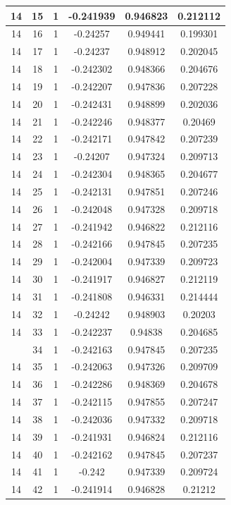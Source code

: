 \documentclass[12pt,a4paper]{article}
\numberwithin{equation}{section}
\numberwithin{figure}{section}
\numberwithin{table}{section}
\begin{document}
\begin{longtable}{|c|c|c|c|c|c|}
14 & 15 & 1 & -0.241939 & 0.946823 & 0.212112 \\ \hline
14 & 16 & 1 & -0.24257 & 0.949441 & 0.199301 \\ \hline
14 & 17 & 1 & -0.24237 & 0.948912 & 0.202045 \\ \hline
14 & 18 & 1 & -0.242302 & 0.948366 & 0.204676 \\ \hline
14 & 19 & 1 & -0.242207 & 0.947836 & 0.207228 \\ \hline
14 & 20 & 1 & -0.242431 & 0.948899 & 0.202036 \\ \hline
14 & 21 & 1 & -0.242246 & 0.948377 & 0.20469 \\ \hline
14 & 22 & 1 & -0.242171 & 0.947842 & 0.207239 \\ \hline
14 & 23 & 1 & -0.24207 & 0.947324 & 0.209713 \\ \hline
14 & 24 & 1 & -0.242304 & 0.948365 & 0.204677 \\ \hline
14 & 25 & 1 & -0.242131 & 0.947851 & 0.207246 \\ \hline
14 & 26 & 1 & -0.242048 & 0.947328 & 0.209718 \\ \hline
14 & 27 & 1 & -0.241942 & 0.946822 & 0.212116 \\ \hline
14 & 28 & 1 & -0.242166 & 0.947845 & 0.207235 \\ \hline
14 & 29 & 1 & -0.242004 & 0.947339 & 0.209723 \\ \hline
14 & 30 & 1 & -0.241917 & 0.946827 & 0.212119 \\ \hline
14 & 31 & 1 & -0.241808 & 0.946331 & 0.214444 \\ \hline
14 & 32 & 1 & -0.24242 & 0.948903 & 0.20203 \\ \hline
14 & 33 & 1 & -0.242237 & 0.94838 & 0.204685 \\ \hline
\pagebreak
14 & 34 & 1 & -0.242163 & 0.947845 & 0.207235 \\ \hline
14 & 35 & 1 & -0.242063 & 0.947326 & 0.209709 \\ \hline
14 & 36 & 1 & -0.242286 & 0.948369 & 0.204678 \\ \hline
14 & 37 & 1 & -0.242115 & 0.947855 & 0.207247 \\ \hline
14 & 38 & 1 & -0.242036 & 0.947332 & 0.209718 \\ \hline
14 & 39 & 1 & -0.241931 & 0.946824 & 0.212116 \\ \hline
14 & 40 & 1 & -0.242162 & 0.947845 & 0.207237 \\ \hline
14 & 41 & 1 & -0.242 & 0.947339 & 0.209724 \\ \hline
14 & 42 & 1 & -0.241914 & 0.946828 & 0.21212 \\ \hline

\end{longtable}
\end{document}
